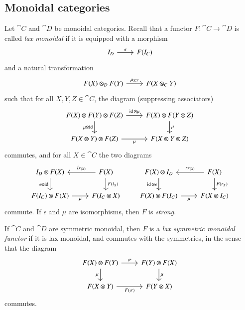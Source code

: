 \documentclass[12pt,oneside,article,draft]{memoir}
\begin{document}
\begin{enumerate}
\section{Monoidal categories}\label{sec:prelim monoidal}

Let $\cat{C}$ and $\cat{D}$ be monoidal categories.
Recall that a functor $F\colon\cat{C}\to\cat{D}$ is called \emph{lax monoidal} if it is equipped with a morphism
\[
\begin{tikzcd}
	I_D \rar{\epsilon} & F(I_C)
\end{tikzcd}
\]
and a natural transformation
\[
\begin{tikzcd}
	F(X) \otimes_D F(Y) \rar{\mu_{X,Y}} & F(X\otimes_C Y)
\end{tikzcd}
\]
such that for all $X,Y,Z\in\cat{C}$, the diagram (suppressing associators)
\[
\begin{tikzcd}
	F(X)\otimes F(Y) \otimes F(Z)
		\rar{\id\otimes\mu}
		\dar[swap]{\mu\otimes\id}
	& F(X)\otimes F(Y\otimes Z)
		\dar{\mu} \\
	F(X\otimes Y)\otimes F(Z)
		\rar[swap]{\mu}
	& F(X\otimes Y\otimes Z)
\end{tikzcd}
\]
commutes, and for all $X\in\cat{C}$ the two diagrams
\[
\begin{tikzcd}
	I_D\otimes F(X)
		\dar[swap]{\epsilon\otimes\id}
	& F(X)
		\lar[swap]{l_{F(X)}}
		\dar{F(l_X)} \\
	F(I_C)\otimes F(X)
		\rar[swap]{\mu}
	& F(I_C\otimes X)
\end{tikzcd}
\qquad
\begin{tikzcd}
	F(X) \otimes I_D
		\dar[swap]{\id\otimes\epsilon}
	& F(X)
		\lar[swap]{r_{F(X)}}
		\dar{F(r_X)} \\
	F(X)\otimes F(I_C)
		\rar[swap]{\mu}
	& F(X\otimes I_C)
\end{tikzcd}
\]
commute.
If $\epsilon$ and $\mu$ are isomorphisms, then $F$ is \emph{strong}.

If $\cat{C}$ and $\cat{D}$ are symmetric monoidal, then $F$ is a \emph{lax symmetric monoidal functor} if it is lax monoidal, and commutes with the symmetries, in the sense that the diagram
\[
\begin{tikzcd}
	F(X)\otimes F(Y)
		\rar{\sigma}
		\dar[swap]{\mu}
	& F(Y)\otimes F(X)
		\dar{\mu} \\
	F(X\otimes Y)
		\rar[swap]{F(\sigma)}
	& F(Y\otimes X)
\end{tikzcd}
\]
commutes.


\end{enumerate}
\end{document}
